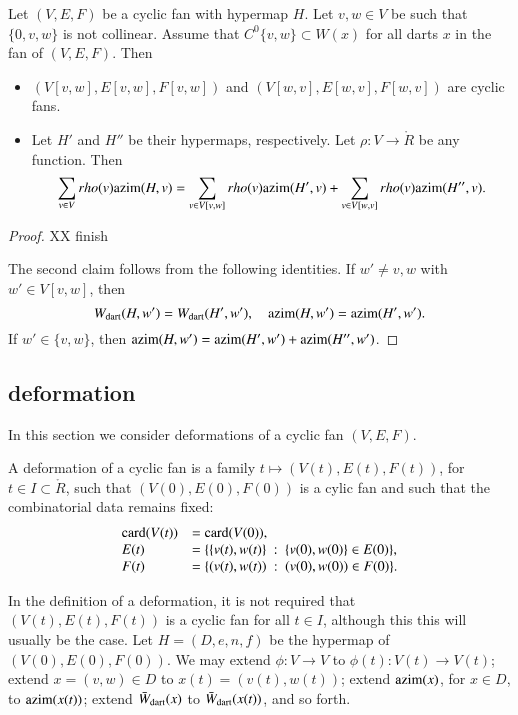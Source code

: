 {{\begin{lemma}  Let $(V,E,F)$ be a cyclic fan with hypermap $H$.  Let $v,w\in V$ be such that $\{0,v,w\}$ is not collinear.  Assume that $C^0\{v,w\}\subset W(x)$ for all darts $x$ in the fan of $(V,E,F)$. Then
\begin{itemize}
\item $(V[v,w],E[v,w],F[v,w])$ and $(V[w,v],E[w,v],F[w,v])$ are cyclic fans.  
\item Let $H'$ and $H''$ be their hypermaps, respectively.  Let $\rho:V\to\ring{R}$ be any function.  Then
$$
\sum_{v\in V} rho(v){\operatorname{azim}}(H,v) = \sum_{v\in V[v,w]}rho(v){\operatorname{azim}}(H',v) + \sum_{v\in V[w,v]}rho(v){\operatorname{azim}}(H'',v).
$$
\end{itemize}
\end{lemma}

\begin{proof}
XX finish

The second claim follows from the following identities.
If $w'\ne v,w$ with $w'\in V[v,w]$, then
$$
W_{\text{dart}}(H,w')=W_{\text{dart}}(H',w'),\quad {\operatorname{azim}}(H,w') = {\operatorname{azim}}(H',w').
$$
If $w'\in\{v,w\}$, then
${\operatorname{azim}}(H,w')={\operatorname{azim}}(H',w') +{\operatorname{azim}}(H'',w')$.
\end{proof}

\subsection{deformation}

In this section we consider deformations of a cyclic fan $(V,E,F)$.

\begin{definition}
A deformation of a cyclic fan is a family $t\mapsto (V(t),E(t),F(t))$, for $t\in I\subset\ring{R}$, such that $(V(0),E(0),F(0))$ is a cylic fan and such that the combinatorial data remains fixed:
$$
\begin{array}{lll}
{\operatorname{card}}(V(t)) &= {\operatorname{card}}(V(0)),\\
E(t)&=\{\{v(t),w(t)\}\ :\  \{v(0),w(0)\}\in E(0)\},\\
F(t)&= \{(v(t),w(t)) \ :\   (v(0),w(0))\in F(0)\}.
\end{array}
$$
\end{definition}

In the definition of a deformation, it is not required that $(V(t),E(t),F(t))$ is a cyclic fan for all $t\in I$, although this this will usually be the case.  Let $H=(D,e,n,f)$ be the hypermap of $(V(0),E(0),F(0))$.  We may extend $\phi:V\to V$ to $\phi(t):V(t)\to V(t)$; extend $x=(v,w)\in D$ to $x(t)=(v(t),w(t))$; extend ${\operatorname{azim}}(x)$, for $x\in D$,  to ${\operatorname{azim}}(x(t))$; extend $\bar W_{\text{dart}}(x)$ to $\bar W_{\text{dart}}(x(t))$, and so forth. 


}}
